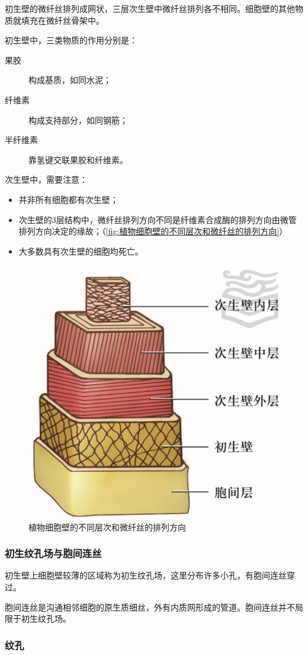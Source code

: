 	初生壁的微纤丝排列成网状，三层次生壁中微纤丝排列各不相同。细胞壁的其他物质就填充在微纤丝骨架中。
	
	初生壁中，三类物质的作用分别是：
	\begin{description}
		\item[果胶] 构成基质，如同水泥；
		\item[纤维素] 构成支持部分，如同钢筋；
		\item[半纤维素] 靠氢键交联果胶和纤维素。
	\end{description}
	
	次生壁中，需要注意：
	\begin{itemize}
		\item 并非所有细胞都有次生壁；
		\item 次生壁的3层结构中，微纤丝排列方向不同是纤维素合成酶的排列方向由微管排列方向决定的缘故；（\autoref{fig:植物细胞壁的不同层次和微纤丝的排列方向}）
		\item 大多数具有次生壁的细胞均死亡。
	\end{itemize}
	
	\begin{figure}[htbp]
		\centering
		\includegraphics[width=0.4\linewidth]{Pics/次生壁的3层}
		\caption{植物细胞壁的不同层次和微纤丝的排列方向}
		\label{fig:植物细胞壁的不同层次和微纤丝的排列方向}
	\end{figure}
	
	\subsubsection{初生纹孔场与胞间连丝}
	
	初生壁上细胞壁较薄的区域称为初生纹孔场，这里分布许多小孔，有胞间连丝穿过。
	
	胞间连丝是沟通相邻细胞的原生质细丝，外有内质网形成的管道。胞间连丝并不局限于初生纹孔场。
	
	\subsubsection{纹孔}
	
